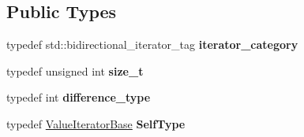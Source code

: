 \subsection*{Public Types}
\begin{DoxyCompactItemize}
\item 
\mbox{\label{classJson_1_1ValueIteratorBase_a02fd11a4fbdc0007da1e8bcf5e6b83c3}} 
typedef std\+::bidirectional\+\_\+iterator\+\_\+tag {\bfseries iterator\+\_\+category}
\item 
\mbox{\label{classJson_1_1ValueIteratorBase_a9d3a3c7ce5cdefe23cb486239cf07bb5}} 
typedef unsigned int {\bfseries size\+\_\+t}
\item 
\mbox{\label{classJson_1_1ValueIteratorBase_a4e44bf8cbd17ec8d6e2c185904a15ebd}} 
typedef int {\bfseries difference\+\_\+type}
\item 
\mbox{\label{classJson_1_1ValueIteratorBase_a9d2a940d03ea06d20d972f41a89149ee}} 
typedef \hyperlink{classJson_1_1ValueIteratorBase}{Value\+Iterator\+Base} {\bfseries Self\+Type}
\end{DoxyCompactItemize}

